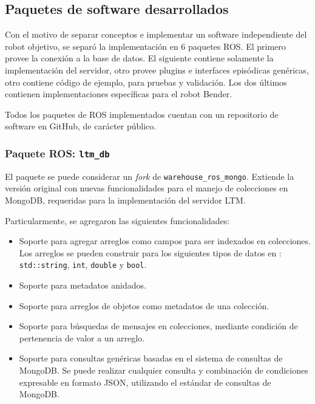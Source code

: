 \subsection{Paquetes de software desarrollados}\label{sec:impl_packages}

Con el motivo de separar conceptos e implementar un software independiente del robot objetivo, se separó la implementación en 6 paquetes ROS. El primero provee la conexión a la base de datos. El siguiente contiene solamente la implementación del servidor, otro provee plugins e interfaces episódicas genéricas, otro contiene código de ejemplo, para pruebas y validación. Los dos últimos contienen implementaciones específicas para el robot Bender.

Todos los paquetes de ROS implementados cuentan con un repositorio de software en GitHub, de carácter público.

\subsubsection{Paquete ROS: \texttt{ltm\_db}}

El paquete se puede considerar un \textit{fork} de \texttt{warehouse\_ros\_mongo}. Extiende la versión original con nuevas funcionalidades para el manejo de colecciones en MongoDB, requeridas para la implementación del servidor LTM.

Particularmente, se agregaron las siguientes funcionalidades:
\begin{itemize}
\item Soporte para agregar arreglos como campos para ser indexados en colecciones. Los arreglos se pueden construir para los siguientes tipos de datos en \CC: \texttt{std::string}, \texttt{int}, \texttt{double} y \texttt{bool}. 
\item Soporte para metadatos anidados.
\item Soporte para arreglos de objetos como metadatos de una colección.
\item Soporte para búsquedas de mensajes en colecciones, mediante condición de pertenencia de valor a un arreglo.
\item Soporte para consultas genéricas basadas en el sistema de consultas de MongoDB. Se puede realizar cualquier consulta y combinación de condiciones expresable en formato JSON, utilizando el estándar de consultas de MongoDB.
\end{itemize}

